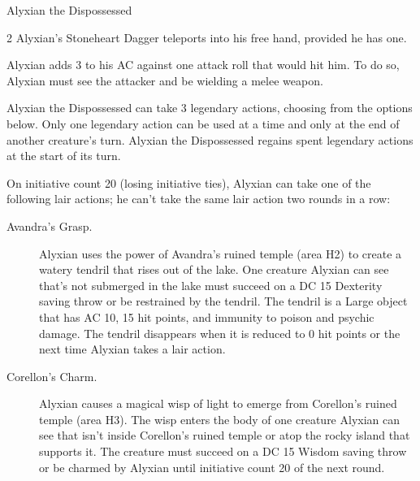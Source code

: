 \documentclass[10pt,a4paper,twoside,fancy,bg=print,twocolumn,openany,nodeprecatedcode]{dndbook}
\begin{document}
\begin{DndMonster}[float*=b,width=\textwidth + 8pt]{Alyxian the Dispossessed}
\begin{multicols}{2}
Alyxian's Stoneheart Dagger teleports into his free hand, provided he has one.

Alyxian adds 3 to his AC against one attack roll that would hit him. To do so, Alyxian must see the attacker and be wielding a melee weapon.

Alyxian the Dispossessed can take 3 legendary actions, choosing from the options below. Only one legendary action can be used at a time and only at the end of another creature's turn. Alyxian the Dispossessed regains spent legendary actions at the start of its turn.

\begin{DndMonsterLegendaryActions}
\end{DndMonsterLegendaryActions}
On initiative count 20 (losing initiative ties), Alyxian can take one of the following lair actions; he can't take the same lair action two rounds in a row:


\begin{description}
\item[Avandra's Grasp.]
Alyxian uses the power of Avandra's ruined temple (area H2) to create a watery tendril that rises out of the lake. One creature Alyxian can see that's not submerged in the lake must succeed on a DC 15 Dexterity saving throw or be restrained by the tendril. The tendril is a Large object that has AC 10, 15 hit points, and immunity to poison and psychic damage. The tendril disappears when it is reduced to 0 hit points or the next time Alyxian takes a lair action.

\item[Corellon's Charm.]
Alyxian causes a magical wisp of light to emerge from Corellon's ruined temple (area H3). The wisp enters the body of one creature Alyxian can see that isn't inside Corellon's ruined temple or atop the rocky island that supports it. The creature must succeed on a DC 15 Wisdom saving throw or be charmed by Alyxian until initiative count 20 of the next round.


\end{description}
\end{multicols}
\end{DndMonster}
\end{document}
